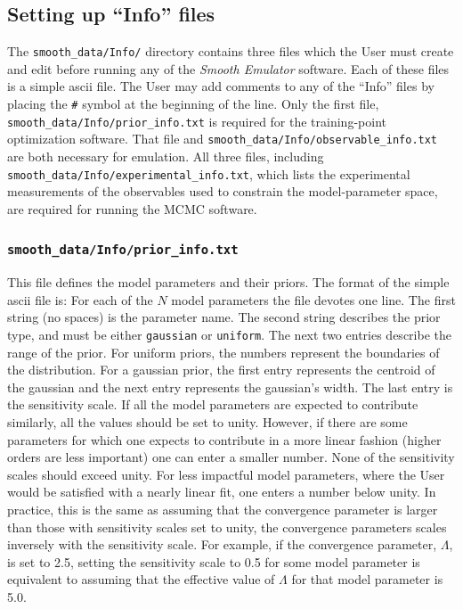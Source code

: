 \documentclass[UserManual.tex]{subfiles}
\begin{document}
\begin{sloppypar}
\subsection{Setting up ``Info'' files}
The {\tt smooth\_data/Info/} directory contains three files which the User must create and edit before running any of the {\it Smooth Emulator} software. Each of these files is a simple ascii file. The User may add comments to any of the ``Info'' files by placing the {\tt \#} symbol at the beginning of the line. Only the first file, {\tt smooth\_data/Info/prior\_info.txt} is required for the training-point optimization software. That file and {\tt smooth\_data/Info/observable\_info.txt} are both necessary for emulation. All three files, including {\tt smooth\_data/Info/experimental\_info.txt}, which lists the experimental measurements of the observables used to constrain the model-parameter space, are required for running the MCMC software.

\subsubsection{{\tt smooth\_data/Info/prior\_info.txt}}
This file defines the model parameters and their priors. The format of the simple ascii file is:
\vspace*{-8pt}{\tt \begin{Verbatim}[commandchars=\\\{\}]
parameter_name_1  prior_type_1 xmin_1/centroid_1  xmax_1/Rgauss_1  sensivity_scale_1
parameter_name_2  prior_type_2 xmin_2/centroid_2  xmin_2/Rgauss_2  sensivity_scale_2
   .
parameter_name_N  prior_type_N xmin_N/centroid_N  xmin_N/Rgauss_N  sensivity_scale_N
\end{Verbatim}
}\vspace*{-8pt}
For each of the $N$ model parameters the file devotes one line. The first string (no spaces) is the parameter name. The second string describes the prior type, and must be either {\tt gaussian} or {\tt uniform}. The next two entries describe the range of the prior. For uniform priors, the numbers represent the boundaries of the distribution. For a gaussian prior, the first entry represents the centroid of the gaussian and the next entry  represents the gaussian's width. The last entry is the sensitivity scale. If all the model parameters are expected to contribute similarly, all the values should be set to unity. However, if there are some parameters for which one expects to contribute in a more linear fashion (higher orders are less important) one can enter a smaller number. None of the sensitivity scales should exceed unity. For less impactful model parameters, where the User would be satisfied with a nearly linear fit, one enters a number below unity. In practice, this is the same as assuming that the convergence parameter is larger than those with sensitivity scales set to unity, the convergence parameters scales inversely with the sensitivity scale. For example, if the convergence parameter, $\Lambda$, is set to 2.5, setting the sensitivity scale to 0.5 for some model parameter is equivalent to assuming that the effective value of $\Lambda$ for that model parameter is 5.0. 


\end{sloppypar}
\end{document}
